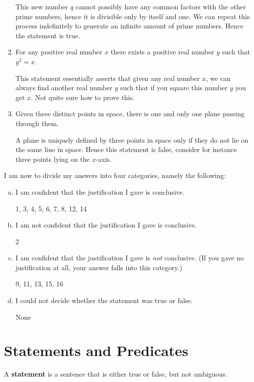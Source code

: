 \documentclass[a4paper, 11pt]{report}
\theoremstyle{plain}
\theoremstyle{definition}
\begin{document}
\begin{enumerate}
    This new number $q$ cannot possibly have any common factors with the
    other prime numbers, hence it is divisible only by itself and one.  We
    can repeat this process indefinitely to generate an infinite amount of
    prime numbers. Hence the statement is true.

  \item For any positive real number $x$ there exists a positive real number $y$ such that $y^2 = x$.

    This statement essentially asserts that given any real number $x$, we
    can always find another real number $y$ such that if you square this
    number $y$ you get $x$. Not quite sure how to prove this.

  \item Given three distinct points in space, there is one and only one plane passing through them.

    A plane is uniquely defined by three points in space only if they do not
    lie on the same line in space. Hence this statement is false, consider for
    instance three points lying on the $x$-axis.

\end{enumerate} 

I am now to divide my answers into four categories, namely the following:
\begin{enumerate}[a)]
  \item I am confident that the justification I gave is conclusive.

    1, 3, 4, 5, 6, 7, 8, 12, 14
  \item I am not confident that the justification I gave is conclusive.

    2
  \item I am confident that the justification I gave is \textit{not} conclusive. (If you gave no justification at all, your answer falls
    into this category.)

    9, 11, 13, 15, 16 
  \item I could not decide whether the statement was true or false.

    None
\end{enumerate}

\section{Statements and Predicates}
\label{sec:statements_and_predicates}

A \textbf{statement} is a sentence that is either true or false, but not ambiguous.
\end{document}
